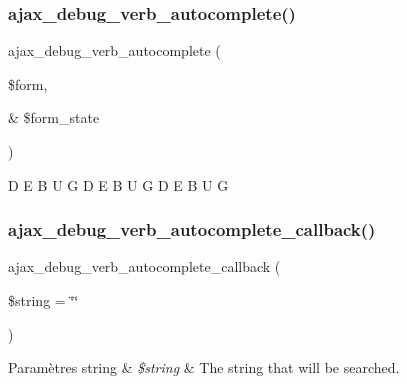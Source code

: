 \subsubsection{\texorpdfstring{ajax\+\_\+debug\+\_\+verb\+\_\+autocomplete()}{ajax\_debug\_verb\_autocomplete()}}
{\footnotesize\ttfamily ajax\+\_\+debug\+\_\+verb\+\_\+autocomplete (\begin{DoxyParamCaption}\item[{}]{\$form,  }\item[{\&}]{\$form\+\_\+state }\end{DoxyParamCaption})}

D E B U G D E B U G D E B U G \hypertarget{conjoc__debug__webForm_8inc_aedd67c4b770b58826708010ce4ef7ac7}{}\label{conjoc__debug__webForm_8inc_aedd67c4b770b58826708010ce4ef7ac7} 
\subsubsection{\texorpdfstring{ajax\+\_\+debug\+\_\+verb\+\_\+autocomplete\+\_\+callback()}{ajax\_debug\_verb\_autocomplete\_callback()}}
{\footnotesize\ttfamily ajax\+\_\+debug\+\_\+verb\+\_\+autocomplete\+\_\+callback (\begin{DoxyParamCaption}\item[{}]{\$string = {\ttfamily \char`\"{}\char`\"{}} }\end{DoxyParamCaption})}


\begin{DoxyParams}[1]{Paramètres}
string & {\em \$string} & The string that will be searched. \\
\hline
\end{DoxyParams}
